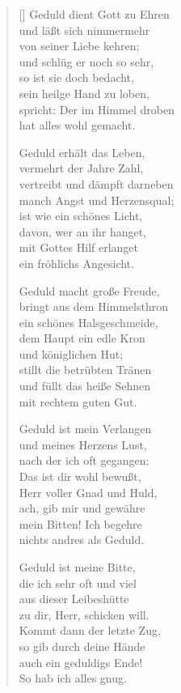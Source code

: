 \begin{multicols}{2}
\begin{verse}[\versewidth]
 Geduld dient Gott zu Ehren\\
und läßt sich nimmermehr\\
von seiner Liebe kehren;\\
und schlüg er noch so sehr,\\
so ist sie doch bedacht,\\
sein heilge Hand zu loben,\\
spricht: Der im Himmel droben\\
hat alles wohl gemacht.

 Geduld erhält das Leben,\\
vermehrt der Jahre Zahl,\\
vertreibt und dämpft darneben\\
manch Angst und Herzensqual;\\
ist wie ein schönes Licht,\\
davon, wer an ihr hanget,\\
mit Gottes Hilf erlanget\\
ein fröhlichs Angesicht.

 Geduld macht große Freude,\\
bringt aus dem Himmelsthron\\
ein schönes Halsgeschmeide,\\
dem Haupt ein edle Kron\\
und königlichen Hut;\\
stillt die betrübten Tränen\\
und füllt das heiße Sehnen\\
mit rechtem guten Gut.

 Geduld ist mein Verlangen\\
und meines Herzens Lust,\\
nach der ich oft gegangen:\\
Das ist dir wohl bewußt,\\
Herr voller Gnad und Huld,\\
ach, gib mir und gewähre\\
mein Bitten! Ich begehre\\
nichts andres als Geduld.

 Geduld ist meine Bitte,\\
die ich sehr oft und viel\\
aus dieser Leibeshütte\\
zu dir, Herr, schicken will.\\
Kommt dann der letzte Zug,\\
so gib durch deine Hände\\
auch ein geduldigs Ende!\\
So hab ich alles gnug.

\end{verse}
\end{multicols}

